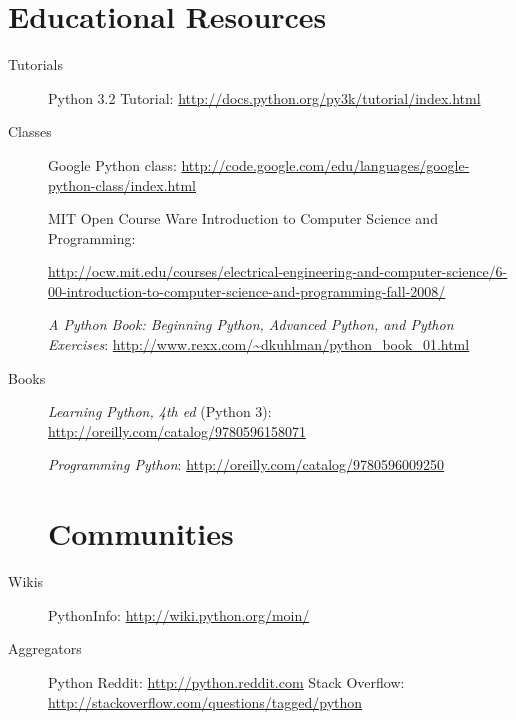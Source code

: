\documentclass{report}
\begin{document}
\section{Educational Resources}
\begin{description}
	\item[Tutorials]

Python 3.2 Tutorial: \url{http://docs.python.org/py3k/tutorial/index.html}  \cite{website:Python3docs}
	\item[Classes]

Google Python class: \url{http://code.google.com/edu/languages/google-python-class/index.html} \cite{website:GooglePythonClass}

MIT Open Course Ware Introduction to Computer Science and Programming:

\href{http://ocw.mit.edu/courses/electrical-engineering-and-computer-science/6-00-introduction-to-computer-science-and-programming-fall-2008/}{http://ocw.mit.edu/courses/electrical-engineering-and-computer-science/6-00-introduction-to-computer-science-and-programming-fall-2008/} \cite{website:OCW}

\emph{A Python Book: Beginning Python, Advanced Python, and Python Exercises}: \url{http://www.rexx.com/~dkuhlman/python_book_01.html}

	\item[Books]
\emph{Learning Python, 4th ed} (Python 3): \url{http://oreilly.com/catalog/9780596158071}  \cite{LearningPython4th}

\emph{Programming Python}: \url{http://oreilly.com/catalog/9780596009250}  \cite{ProgrammingPython} 

\section{Communities}
	\item[Wikis]
PythonInfo: \url{http://wiki.python.org/moin/}
	\item[Aggregators]
Python Reddit: \url{http://python.reddit.com}
Stack Overflow: \url{http://stackoverflow.com/questions/tagged/python}

\end{description}

\printglossaries



\end{document}
